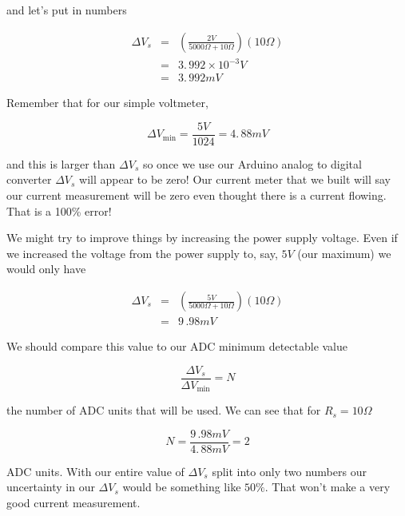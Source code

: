 \noindent and let's put in numbers

\begin{eqnarray*}
	\Delta V_{s} &=&\left(\frac{2\unit{V}}{5000\unit{\Omega}+10\unit{\Omega}}\right) \left( 10\unit{\Omega}\right) \\
    &=&3.\,\allowbreak 992\times 10^{-3}\unit{V} \\
    &=&3.\,\allowbreak 992\unit{mV}
\end{eqnarray*}

\noindent Remember that for our simple voltmeter, 

\begin{equation*}
	\Delta V_{\min }=\frac{5\unit{V}}{1024}=4.\,\allowbreak 88\unit{mV}
\end{equation*}

\noindent and this is larger than $\Delta V_{s}$ so once we use our Arduino analog to digital converter $\Delta V_{s}$ will appear to be zero! Our current meter that we built will say our current measurement will be zero even thought there is a current flowing. That is a 100\% error!

We might try to improve things by increasing the power supply voltage. Even
if we increased the voltage from the power supply to, say, $5\unit{V}$ (our
maximum) we would only have 

\begin{eqnarray*}
	\Delta V_{s}   &=&\left(\frac{5\unit{V}}{5000\unit{\Omega}+10\unit{\Omega}}\right) \left( 10\unit{\Omega}\right) \\
    &=&9\,.98\unit{mV}
\end{eqnarray*}

We should compare this value to our ADC minimum detectable value 

\begin{equation*}
	\frac{\Delta V_{s}}{\Delta V_{\min }}=N
\end{equation*}

\noindent the number of ADC units that will be used. We can see that for $R_{s}=10\unit{\Omega}$ 

\begin{equation*}
	N=\frac{9\,.98\unit{mV}}{4.\,\allowbreak 88\unit{mV}}=2
\end{equation*}

\noindent ADC units. With our entire value of $\Delta V_{s}$ split into only two numbers our uncertainty in our $\Delta V_{s}$ would be something like $50\%.$ That won't make a very good current measurement.

